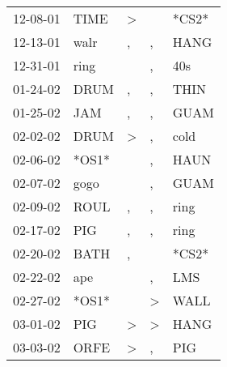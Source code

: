 \begin{supertabular}{p{0.07\textwidth}p{0.06\textwidth}p{0.02\textwidth}p{0.02\textwidth}p{0.06\textwidth}}
          12-08-01\textsuperscript{} &           TIME\textsuperscript{} &     \textgreater &               &                            *CS2* \\
          12-13-01\textsuperscript{} &           walr\textsuperscript{} &                , &             , &           HANG\textsuperscript{} \\
          12-31-01\textsuperscript{} &           ring\textsuperscript{} &                  &             , &            40s\textsuperscript{} \\
          01-24-02\textsuperscript{} &           DRUM\textsuperscript{} &                , &             , &           THIN\textsuperscript{} \\
          01-25-02\textsuperscript{} &            JAM\textsuperscript{} &                , &             , &           GUAM\textsuperscript{} \\
          02-02-02\textsuperscript{} &           DRUM\textsuperscript{} &     \textgreater &             , &           cold\textsuperscript{} \\
          02-06-02\textsuperscript{} &                            *OS1* &                  &             , &           HAUN\textsuperscript{} \\
          02-07-02\textsuperscript{} &           gogo\textsuperscript{} &                  &             , &           GUAM\textsuperscript{} \\
          02-09-02\textsuperscript{} &           ROUL\textsuperscript{} &                , &             , &           ring\textsuperscript{} \\
          02-17-02\textsuperscript{} &            PIG\textsuperscript{} &                , &             , &           ring\textsuperscript{} \\
          02-20-02\textsuperscript{} &           BATH\textsuperscript{} &                , &               &                            *CS2* \\
          02-22-02\textsuperscript{} &            ape\textsuperscript{} &                  &             , &            LMS\textsuperscript{} \\
          02-27-02\textsuperscript{} &                            *OS1* &                  &  \textgreater &           WALL\textsuperscript{} \\
          03-01-02\textsuperscript{} &            PIG\textsuperscript{} &     \textgreater &  \textgreater &           HANG\textsuperscript{} \\
          03-03-02\textsuperscript{} &           ORFE\textsuperscript{} &     \textgreater &             , &            PIG\textsuperscript{} \\

\end{supertabular}
